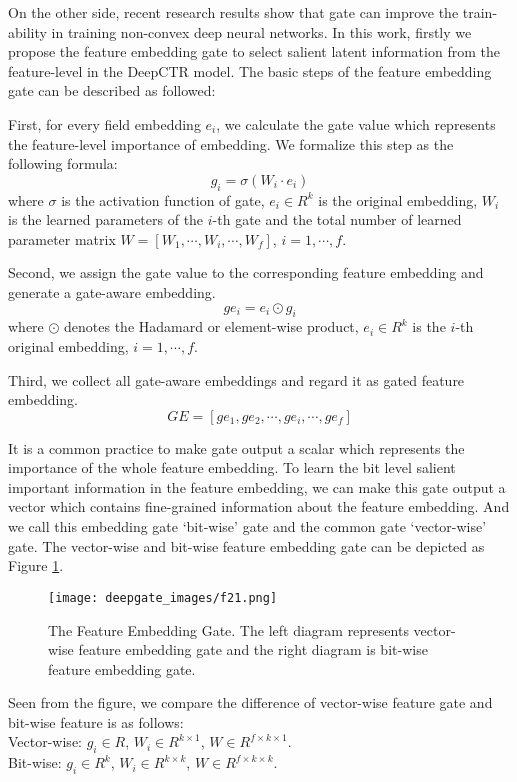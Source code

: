 \documentclass[sigconf,nonacm=true]{acmart}
\begin{document}
On the other side, recent research results show that gate can improve the train-ability in training non-convex deep
neural networks\cite{glorot2010understanding}.
In this work, firstly we propose the feature embedding gate to select salient latent information from the feature-level in the DeepCTR model. 
The basic steps of the feature embedding gate can be described as followed:

First, for every field embedding $e_i$, we calculate the gate value which represents the feature-level importance of embedding. 
We formalize this step as the following formula: 
\begin{equation}
  g_i = \sigma(W_{i} \cdot e_i)
\end{equation}
where $\sigma$ is the activation function of gate, $e_i \in R^{k}$ is the original embedding, $W_{i}$ is the learned parameters of the $i$-th gate and the total number of learned parameter matrix $W=[W_1, \cdots,W_i, \cdots, W_f]$, $i=1, \cdots, f$.

Second, we assign the gate value to the corresponding feature embedding and generate a gate-aware embedding.
\begin{equation}
  ge_i = e_i \odot g_i 
\end{equation}
where $\odot$ denotes the Hadamard or element-wise product, $e_i \in R^{k}$ is the $i$-th original embedding, $i=1, \cdots, f$.

Third, we collect all gate-aware embeddings and regard it as gated feature embedding.
\begin{equation}
  GE=[ge_1, ge_2, \cdots,ge_i, \cdots, ge_f]
\end{equation}

It is a common practice to make gate output a scalar which represents the importance of the whole feature embedding.
To learn the bit level salient important information in the feature embedding, we can make this gate output a vector
which contains fine-grained information about the feature embedding.
And we call this embedding gate `bit-wise' gate and the common gate `vector-wise' gate. 
The vector-wise and bit-wise feature embedding gate can be depicted  as Figure \ref{fig:e1}.

\begin{figure}[hbt!]
   \texttt{[image: deepgate\_images/f21.png]}
  \caption{The Feature Embedding Gate. The left diagram represents vector-wise feature embedding gate and the right diagram is bit-wise feature embedding gate.}
  \label{fig:e1}
\end{figure}
Seen from the figure, we compare the difference of vector-wise feature gate and bit-wise feature is as follows:
\\
Vector-wise: $g_i \in R$, $W_{i} \in R^{k \times 1}$, $W \in R^{f \times k \times 1}.$ \\
Bit-wise: $g_i \in R^{k}$, $W_{i} \in R^{k \times k}$, $W \in R^{f \times k \times k}.$\\
\end{document}
